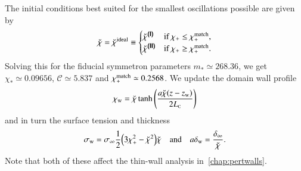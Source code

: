 The initial conditions best suited for the smallest oscillations possible are given by 
\begin{equation}\label{eq:untitled2:optimal_chi_breve}
    \breve{\chi} = \breve{\chi}^\mathrm{ideal}\equiv \begin{cases}
        \breve{\chi}^{\text{{\footnotesize{\textsf{\textbf{({I})}}}}}} &\text{if } \chi_+ \leq\chi_+^\mathrm{match}, \\
        \breve{\chi}^{\text{{\footnotesize{\textsf{\textbf{({II})}}}}}} &\text{if } \chi_+ \geq\chi_+^\mathrm{match}.
    \end{cases}
\end{equation}
Solving this for the fiducial symmetron parameters %
$m_\ast \simeq 268.36$, we get $\chi_\ast \simeq 0.09656$, $\mathcal{C}\simeq 5.837$ and $\chi_+^\mathrm{match}\simeq 0.2568$. We update the domain wall profile
\begin{equation}\label{eq:untitled2:chi_w_quasistatic_FLRW_updated}
    \chi_\mathrm{w} = \breve{\chi} \tanh{{\left(  \frac{a\breve{\chi}(z-z\ensuremath{_\mathrm{w}})}{2L_{\text{\tiny{C}}}}  \right)}}
\end{equation}
and in turn the surface tension and thickness
\begin{equation}
    \sigma_\mathrm{w} = \sigma_\infty \frac{1}{2} {\left(  3\chi_+^2- \breve{\chi}^2  \right)}\breve{\chi} \quad\text{and}\quad a\delta_\mathrm{w} = \frac{\delta_\infty}{\breve{\chi}} .
\end{equation}
Note that both of these affect the thin-wall analysis in~\cref{chap:pertwalls}.







